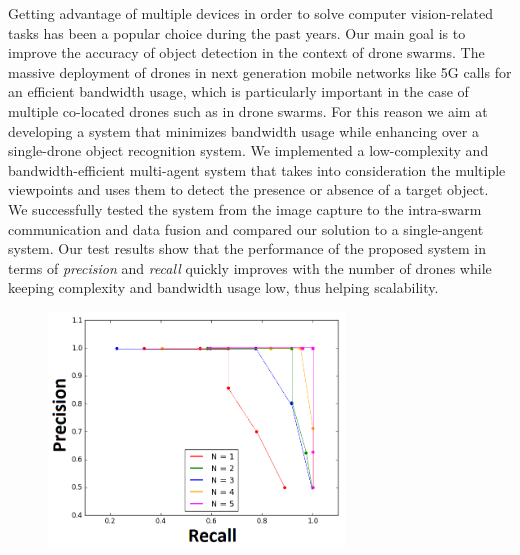 \documentclass[10pt,conference,compsocconf]{IEEEtran}
\begin{document}
Getting advantage of multiple devices in order to solve computer vision-related tasks has been a popular choice during the past years. Our main goal is to improve the accuracy of object detection in the context of drone swarms. 
The massive deployment of drones in next generation mobile networks like 5G calls for an efficient bandwidth usage, which is particularly important in the case of multiple co-located drones such as in drone swarms. For this reason we aim at developing a system that minimizes bandwidth usage while enhancing over a single-drone object recognition system.
We implemented a low-complexity and bandwidth-efficient multi-agent system that takes into consideration the multiple viewpoints and uses them to detect the presence or absence of a target object. We successfully tested the system from the image capture to the intra-swarm communication and data fusion and compared our solution to a single-angent system. Our test results show that the performance of the proposed system in terms of \emph{precision} and \emph{recall} quickly improves with the number of drones while keeping complexity and bandwidth usage low, thus helping scalability.
\begin{figure}
	\captionsetup{type=figure}
	\includegraphics[width=0.7\textwidth]{img/summary_majority_THIRD_N1_5_CONNECTED.png}
\end{figure}
\clearpage{}
\end{document}
